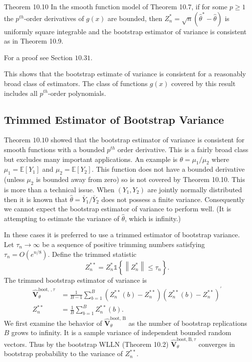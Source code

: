 \documentclass[10pt]{article}
\begin{document}
Theorem 10.10 In the smooth function model of Theorem 10.7, if for some $p \geq 1$ the $p^{t h}$-order derivatives of $g(x)$ are bounded, then $Z_{n}^{*}=\sqrt{n}\left(\widehat{\theta}^{*}-\widehat{\theta}\right)$ is uniformly square integrable and the bootstrap estimator of variance is consistent as in Theorem 10.9.

For a proof see Section $10.31$.

This shows that the bootstrap estimate of variance is consistent for a reasonably broad class of estimators. The class of functions $g(x)$ covered by this result includes all $p^{t h}$-order polynomials.

\subsection{Trimmed Estimator of Bootstrap Variance}
Theorem $10.10$ showed that the bootstrap estimator of variance is consistent for smooth functions with a bounded $p^{t h}$ order derivative. This is a fairly broad class but excludes many important applications. An example is $\theta=\mu_{1} / \mu_{2}$ where $\mu_{1}=\mathbb{E}\left[Y_{1}\right]$ and $\mu_{2}=\mathbb{E}\left[Y_{2}\right]$. This function does not have a bounded derivative (unless $\mu_{2}$ is bounded away from zero) so is not covered by Theorem 10.10. This is more than a technical issue. When $\left(Y_{1}, Y_{2}\right)$ are jointly normally distributed then it is known that $\widehat{\theta}=\bar{Y}_{1} / \bar{Y}_{2}$ does not possess a finite variance. Consequently we cannot expect the bootstrap estimator of variance to perform well. (It is attempting to estimate the variance of $\widehat{\theta}$, which is infinity.)

In these cases it is preferred to use a trimmed estimator of bootstrap variance. Let $\tau_{n} \rightarrow \infty$ be a sequence of positive trimming numbers satisfying $\tau_{n}=O\left(e^{n / 8}\right)$. Define the trimmed statistic
$$
Z_{n}^{* *}=Z_{n}^{*} \mathbb{1}\left\{\left\|Z_{n}^{*}\right\| \leq \tau_{n}\right\} .
$$
The trimmed bootstrap estimator of variance is
$$
\begin{aligned}
\widehat{\boldsymbol{V}}_{\theta}^{\text {boot, }, \tau} &=\frac{1}{B-1} \sum_{b=1}^{B}\left(Z_{n}^{* *}(b)-Z_{n}^{* *}\right)\left(Z_{n}^{* *}(b)-Z_{n}^{* *}\right)^{\prime} \\
Z_{n}^{* *} &=\frac{1}{B} \sum_{b=1}^{B} Z_{n}^{* *}(b) .
\end{aligned}
$$
We first examine the behavior of $\widehat{\boldsymbol{V}}_{\theta}^{\text {boot, } \mathrm{B}}$ as the number of bootstrap replications $B$ grows to infinity. It is a sample variance of independent bounded random vectors. Thus by the bootstrap WLLN (Theorem 10.2) $\widehat{\boldsymbol{V}}_{\theta}^{\mathrm{boot}, \mathrm{B}, \tau}$ converges in bootstrap probability to the variance of $Z_{n}^{* *}$.
\end{document}
